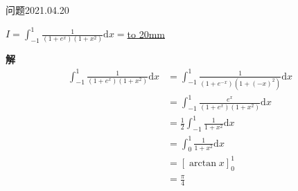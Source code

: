 \begin{mybox}{问题2021.04.20}
	
	\qquad $I=\int_{-1}^{1}\frac{1}{(1+e^x)(1+x^2)}\mathrm{d}x=$\underline{\hbox to 20mm{}}
\end{mybox}
\noindent
\textbf{解}
\begin{align*}
	\int_{-1}^{1}\frac{1}{(1+e^x)(1+x^2)}\mathrm{d}x&=\int_{-1}^{1}\frac{1}{(1+e^{-x})(1+(-x)^2)}\mathrm{d}x\\
	&=\int_{-1}^{1}\frac{e^x}{(1+e^x)(1+x^2)}\mathrm{d}x\\
	&=\frac{1}{2}\int_{-1}^{1}\frac{1}{1+x^2}\mathrm{d}x\\
	&=\int_{0}^{1}\frac{1}{1+x^2}\mathrm{d}x\\
	&=[\arctan x]_{0}^{1}\\
	&=\frac{\pi}{4}
\end{align*}